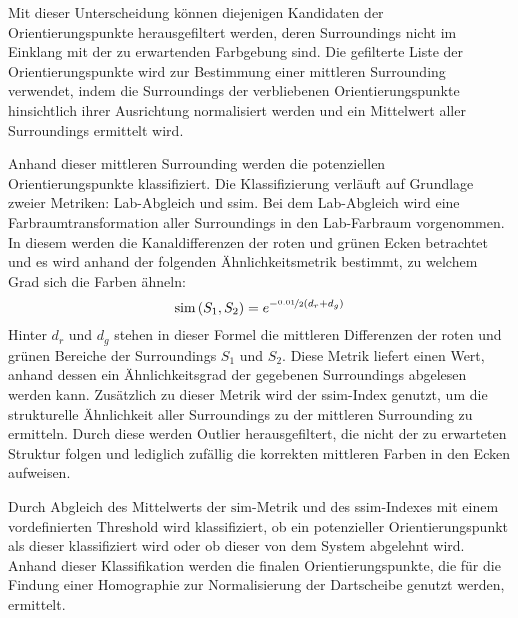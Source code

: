 Mit dieser Unterscheidung können diejenigen Kandidaten der Orientierungspunkte herausgefiltert werden, deren Surroundings nicht im Einklang mit der zu erwartenden Farbgebung sind. Die gefilterte Liste der Orientierungspunkte wird zur Bestimmung einer mittleren Surrounding verwendet, indem die Surroundings der verbliebenen Orientierungspunkte hinsichtlich ihrer Ausrichtung normalisiert werden und ein Mittelwert aller Surroundings ermittelt wird.

Anhand dieser mittleren Surrounding werden die potenziellen Orientierungspunkte klassifiziert. Die Klassifizierung verläuft auf Grundlage zweier Metriken: Lab-Abgleich und \ac{ssim}. Bei dem Lab-Abgleich wird eine Farbraumtransformation aller Surroundings in den Lab-Farbraum vorgenommen. In diesem werden die Kanaldifferenzen der roten und grünen Ecken betrachtet und es wird anhand der folgenden Ähnlichkeitsmetrik bestimmt, zu welchem Grad sich die Farben ähneln:
\[\text{sim}\left(S_1, S_2\right) = e^{-\nicefrac{0.01}{2}(d_r + d_g)}\]
Hinter $d_r$ und $d_g$ stehen in dieser Formel die mittleren Differenzen der roten und grünen Bereiche der Surroundings $S_1$ und $S_2$. Diese Metrik liefert einen Wert, anhand dessen ein Ähnlichkeitsgrad der gegebenen Surroundings abgelesen werden kann. Zusätzlich zu dieser Metrik wird der \ac{ssim}-Index genutzt, um die strukturelle Ähnlichkeit aller Surroundings zu der mittleren Surrounding zu ermitteln. Durch diese werden Outlier herausgefiltert, die nicht der zu erwarteten Struktur folgen und lediglich zufällig die korrekten mittleren Farben in den Ecken aufweisen.

Durch Abgleich des Mittelwerts der $\text{sim}$-Metrik und des \ac{ssim}-Indexes mit einem vordefinierten Threshold wird klassifiziert, ob ein potenzieller Orientierungspunkt als dieser klassifiziert wird oder ob dieser von dem System abgelehnt wird. Anhand dieser Klassifikation werden die finalen Orientierungspunkte, die für die Findung einer Homographie zur Normalisierung der Dartscheibe genutzt werden, ermittelt.
